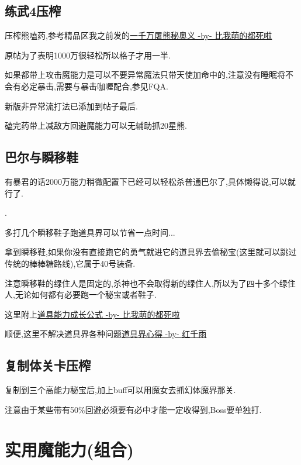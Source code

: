 		\subsection{练武4压榨}

		压榨熊嗑药,参考精品区我之前发的\href{http://tieba.baidu.com/p/3825275063}{一千万屠熊秘奥义 -by- 比我萌的都死啦}

		原帖为了表明1000万很轻松所以格子才用一半.

		如果都带上攻击魔能力是可以不要异常魔法只带天使加命中的,注意没有睡眠将不会有必定暴击,需要与暴击咖喱配合,参见FQA.

		新版非异常流打法已添加到帖子最后.

		磕完药带上减敌方回避魔能力可以无辅助抓20星熊.

		\subsection{巴尔与瞬移鞋}

		有暴君的话2000万能力稍微配置下已经可以轻松杀普通巴尔了,具体懒得说,可以就行了.

		{\color{red}{即便没有这里也建议用2000万能力挑战下,整个游戏挑战关已经没几个了,如果觉得困难可以参考后面修罗篇的巴尔攻略}}.

		多打几个瞬移鞋子跑道具界可以节省一点时间...

		拿到瞬移鞋,如果你没有直接跑它的勇气就进它的道具界去偷秘宝(这里就可以跳过传统的棒棒糖路线),它属于40号装备.

		注意瞬移鞋的绿住人是固定的,杀神也不会取得新的绿住人,所以为了四十多个绿住人,无论如何都有必要跑一个秘宝或者鞋子.

		这里附上\href{http://tieba.baidu.com/f?kz=3834692385}{道具能力成长公式 -by- 比我萌的都死啦}

		顺便,这里不解决道具界各种问题\href{http://tieba.baidu.com/p/3730196003}{道具界心得 -by- 红千雨}


		\subsection{复制体关卡压榨}

		复制到三个高能力秘宝后,加上buff可以用魔女去抓幻体魔界那关.

		注意由于某些带有50\%回避必须要有必中才能一定收得到,Boss要单独打.
	
	\newpage

	\section{实用魔能力(组合)}

